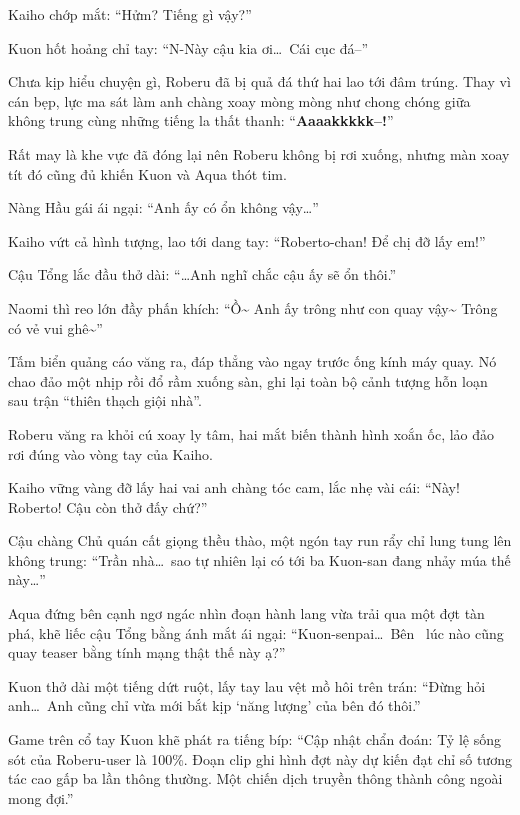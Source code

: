 \documentclass[../main.tex]{subfiles}
\begin{document}
Kaiho chớp mắt: ``Hửm? Tiếng gì vậy?''

Kuon hốt hoảng chỉ tay: ``N-Này cậu kia ơi\dots\ Cái cục đá--''

Chưa kịp hiểu chuyện gì, Roberu đã bị quả đá thứ hai lao tới đâm trúng. Thay vì cán bẹp, lực ma sát làm anh chàng xoay mòng mòng như chong chóng giữa không trung cùng những tiếng la thất thanh: ``\textbf{Aaaakkkkk--!}''


Rất may là khe vực đã đóng lại nên Roberu không bị rơi xuống, nhưng màn xoay tít đó cũng đủ khiến Kuon và Aqua thót tim.

Nàng Hầu gái ái ngại: ``Anh ấy có ổn không vậy\dots''

Kaiho vứt cả hình tượng, lao tới dang tay: ``Roberto-chan! Để chị đỡ lấy em!''

Cậu Tổng lắc đầu thở dài: ``\dots Anh nghĩ chắc cậu ấy sẽ ổn thôi.''

Naomi thì reo lớn đầy phấn khích: ``Ồ\~{} Anh ấy trông như con quay vậy\~{} Trông có vẻ vui ghê\~{}''

Tấm biển quảng cáo văng ra, đáp thẳng vào ngay trước ống kính máy quay. Nó chao đảo một nhịp rồi đổ rầm xuống sàn, ghi lại toàn bộ cảnh tượng hỗn loạn sau trận ``thiên thạch giội nhà''.

Roberu văng ra khỏi cú xoay ly tâm, hai mắt biến thành hình xoắn ốc, lảo đảo rơi đúng vào vòng tay của Kaiho.

Kaiho vững vàng đỡ lấy hai vai anh chàng tóc cam, lắc nhẹ vài cái: ``Này! Roberto! Cậu còn thở đấy chứ?''

Cậu chàng Chủ quán cất giọng thều thào, một ngón tay run rẩy chỉ lung tung lên không trung: ``Trần nhà\dots\ sao tự nhiên lại có tới ba Kuon-san đang nhảy múa thế này\dots''

Aqua đứng bên cạnh ngơ ngác nhìn đoạn hành lang vừa trải qua một đợt tàn phá, khẽ liếc cậu Tổng bằng ánh mắt ái ngại: ``Kuon-senpai\dots\ Bên \hls\ lúc nào cũng quay teaser bằng tính mạng thật thế này ạ?''

Kuon thở dài một tiếng dứt ruột, lấy tay lau vệt mồ hôi trên trán: ``Đừng hỏi anh\dots\ Anh cũng chỉ vừa mới bắt kịp `năng lượng' của bên đó thôi.''

Game trên cổ tay Kuon khẽ phát ra tiếng bíp: ``Cập nhật chẩn đoán: Tỷ lệ sống sót của Roberu-user là 100\%. Đoạn clip ghi hình đợt này dự kiến đạt chỉ số tương tác cao gấp ba lần thông thường. Một chiến dịch truyền thông thành công ngoài mong đợi.''
\end{document}
